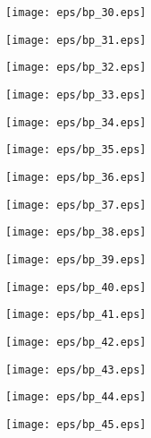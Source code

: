 \documentclass{book}
\begin{document}
	\clearpage\begin{figure}[p]
    \centering
	\texttt{[image: eps/bp\_30.eps]}
	\end{figure}
	\clearpage\begin{figure}[p]
    \centering
	\texttt{[image: eps/bp\_31.eps]}
	\end{figure}
	\clearpage\begin{figure}[p]
    \centering
	\texttt{[image: eps/bp\_32.eps]}
	\end{figure}
	\clearpage\begin{figure}[p]
    \centering
	\texttt{[image: eps/bp\_33.eps]}
	\end{figure}
	\clearpage\begin{figure}[p]
    \centering
	\texttt{[image: eps/bp\_34.eps]}
	\end{figure}
	\clearpage\begin{figure}[p]
    \centering
	\texttt{[image: eps/bp\_35.eps]}
	\end{figure}
	\clearpage\begin{figure}[p]
    \centering
	\texttt{[image: eps/bp\_36.eps]}
	\end{figure}
	\clearpage\begin{figure}[p]
    \centering
	\texttt{[image: eps/bp\_37.eps]}
	\end{figure}
	\clearpage\begin{figure}[p]
    \centering
	\texttt{[image: eps/bp\_38.eps]}
	\end{figure}
	\clearpage\begin{figure}[p]
    \centering
	\texttt{[image: eps/bp\_39.eps]}
	\end{figure}
	\clearpage\begin{figure}[p]
    \centering
	\texttt{[image: eps/bp\_40.eps]}
	\end{figure}
	\clearpage\begin{figure}[p]
    \centering
	\texttt{[image: eps/bp\_41.eps]}
	\end{figure}
	\clearpage\begin{figure}[p]
    \centering
	\texttt{[image: eps/bp\_42.eps]}
	\end{figure}
	\clearpage\begin{figure}[p]
    \centering
	\texttt{[image: eps/bp\_43.eps]}
	\end{figure}
	\clearpage\begin{figure}[p]
    \centering
	\texttt{[image: eps/bp\_44.eps]}
	\end{figure}
	\clearpage\begin{figure}[p]
    \centering
	\texttt{[image: eps/bp\_45.eps]}
	\end{figure}
	\clearpage
\end{document}
